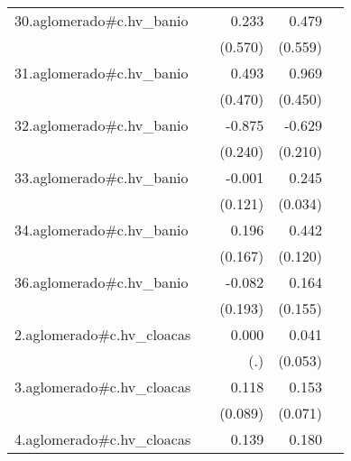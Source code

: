 {\begin{longtable}{l*{4}{D{.}{.}{-1}}}
\addlinespace
30.aglomerado#c.hv\_banio&                     &       0.233         &       0.479         &                     \\
            &                     &     (0.570)         &     (0.559)         &                     \\
\addlinespace
31.aglomerado#c.hv\_banio&                     &       0.493         &       0.969\sym{*}  &                     \\
            &                     &     (0.470)         &     (0.450)         &                     \\
\addlinespace
32.aglomerado#c.hv\_banio&                     &      -0.875\sym{***}&      -0.629\sym{**} &                     \\
            &                     &     (0.240)         &     (0.210)         &                     \\
\addlinespace
33.aglomerado#c.hv\_banio&                     &      -0.001         &       0.245\sym{***}&                     \\
            &                     &     (0.121)         &     (0.034)         &                     \\
\addlinespace
34.aglomerado#c.hv\_banio&                     &       0.196         &       0.442\sym{***}&                     \\
            &                     &     (0.167)         &     (0.120)         &                     \\
\addlinespace
36.aglomerado#c.hv\_banio&                     &      -0.082         &       0.164         &                     \\
            &                     &     (0.193)         &     (0.155)         &                     \\
\addlinespace
2.aglomerado#c.hv\_cloacas&                     &       0.000         &       0.041         &                     \\
            &                     &         (.)         &     (0.053)         &                     \\
\addlinespace
3.aglomerado#c.hv\_cloacas&                     &       0.118         &       0.153\sym{*}  &                     \\
            &                     &     (0.089)         &     (0.071)         &                     \\
\addlinespace
4.aglomerado#c.hv\_cloacas&                     &       0.139\sym{*}  &       0.180\sym{***}&                     \\

\end{longtable}}
